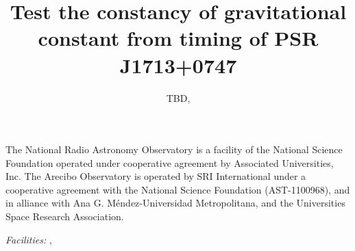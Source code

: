 \documentclass[12pt,preprint]{aastex}
\begin{document}
\title{Test the constancy of gravitational constant from timing of PSR J1713+0747}

\author{%
TBD,
}







\acknowledgements

The National Radio Astronomy Observatory is a facility of the National Science
Foundation operated under cooperative agreement by Associated Universities,
Inc.
The Arecibo Observatory is operated by SRI International under a cooperative
agreement with the National Science Foundation (AST-1100968), and in alliance
with Ana G. Méndez-Universidad Metropolitana, and the Universities Space
Research Association.

{\it Facilities:}
, 

%


\end{document}
